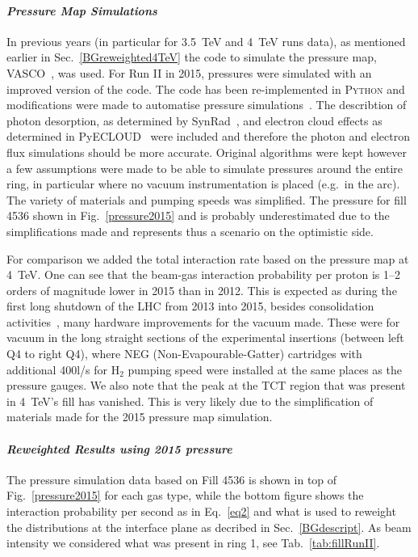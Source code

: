 \paragraph{\textit{Pressure Map Simulations}}
In previous years (in particular for 3.5~TeV and 4~TeV runs data), as mentioned earlier in Sec.~\ref{BGreweighted4TeV} the code to simulate the pressure map, \textsc{VASCO}~\cite{vascoRef}, was used. For Run II in 2015, pressures were simulated with an improved version of the code. The code has been re-implemented in \textsc{Python} and modifications were made to automatise pressure simulations~\cite{christinasStudent}. The describtion of photon desorption, as determined by SynRad~\cite{synradRef}, and electron cloud effects as determined in PyECLOUD~\cite{giovanniPhd} were included and therefore the photon and electron flux simulations should be more accurate. Original algorithms were kept however a few assumptions were made to be able to simulate pressures around the entire ring, in particular where no vacuum instrumentation is placed (e.g.~in the arc). The variety of materials and pumping speeds was simplified. The pressure for fill 4536 shown in Fig.~\ref{pressure2015} and is probably underestimated due to the simplifications made and represents thus a scenario on the optimistic side. 

For comparison we added the total interaction rate based on the pressure map at 4~TeV. One can see that the beam-gas interaction probability per proton is 1--2 orders of magnitude lower in 2015 than in 2012. This is expected as during the first long shutdown of the LHC from 2013 into 2015, besides consolidation activities~\cite{KatyForazIpac14}, many hardware improvements for the vacuum made. These were for vacuum in the long straight sections of the experimental insertions (between left Q4 to right Q4), where NEG (Non-Evapourable-Gatter) cartridges with additional 400l/s for H$_2$ pumping speed were installed at the same places as the pressure gauges. We also note that the peak at the TCT region that was present in 4~TeV's fill has vanished. This is very likely due to the simplification of materials made for the 2015 pressure map simulation.


\paragraph{\textit{Reweighted Results using 2015 pressure}}

The pressure simulation data based on Fill 4536 is shown in top of Fig.~\ref{pressure2015} for each gas type, while the bottom figure shows the interaction probability per second as in Eq.~\ref{eq2} and what is used to reweight the distributions at the interface plane as decribed in Sec.~\ref{BGdescript}. As beam intensity we considered what was present in ring 1, see Tab.~\ref{tab:fillRunII}.

